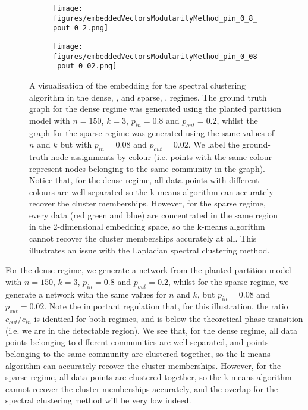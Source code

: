\begin{figure}
	\centering
	\begin{subfigure}{.5\textwidth}
		\centering
		\texttt{[image: figures/embeddedVectorsModularityMethod\_pin\_0\_8\_pout\_0\_2.png]}
		\caption{}
		\label{fig:spectralClusteringEmbeddingVisualisationPin08}
	\end{subfigure}%
	\begin{subfigure}{.5\textwidth}
		\centering
		\texttt{[image: figures/embeddedVectorsModularityMethod\_pin\_0\_08\_pout\_0\_02.png]}
		\caption{}
		\label{fig:spectralClusteringEmbeddingVisualisationPin008}
	\end{subfigure}
	\caption[Visualisation of spectral clustering embedding in sparse and dense regimes.]{\label{fig:spectralClusteringEmbeddingVisualisationPlots} A visualisation of the embedding for the spectral clustering algorithm in the dense, , and sparse, , regimes. The ground truth graph for the dense regime was generated using the planted partition model with $n=150$, $k=3$, $p_{in}=0.8$ and $p_{out}=0.2$, whilst the graph for the sparse regime was generated using the same values of $n$ and $k$ but with $p_{in}=0.08$ and $p_{out}=0.02$. We label the ground-truth node assignments by colour (i.e. points with the same colour represent nodes belonging to the same community in the graph). Notice that, for the dense regime, all data points with different colours are well separated so the k-means algorithm can accurately recover the cluster memberships. However, for the sparse regime, every data (red green and blue) are concentrated in the same region in the 2-dimensional embedding space, so the k-means algorithm cannot recover the cluster memberships accurately at all. This illustrates an issue with the Laplacian spectral clustering method.}
\end{figure}

For the dense regime, we generate a network from the planted partition model with $n=150$, $k=3$, $p_{in}=0.8$ and $p_{out}=0.2$, whilst for the sparse regime, we generate a network with the same values for $n$ and $k$, but $p_{in}=0.08$ and $p_{out}=0.02$.
Note the important regulation that, for this illustration, the ratio $c_{out}/c_{in}$ is identical for both regimes, and is below the theoretical phase transition (i.e. we are in the detectable region).
We see that, for the dense regime, all data points belonging to different communities are well separated, and points belonging to the same community are clustered together, so the k-means algorithm can accurately recover the cluster memberships.
However, for the sparse regime, all data points are clustered together, so the k-means algorithm cannot recover the cluster memberships accurately, and the overlap for the spectral clustering method will be very low indeed.

